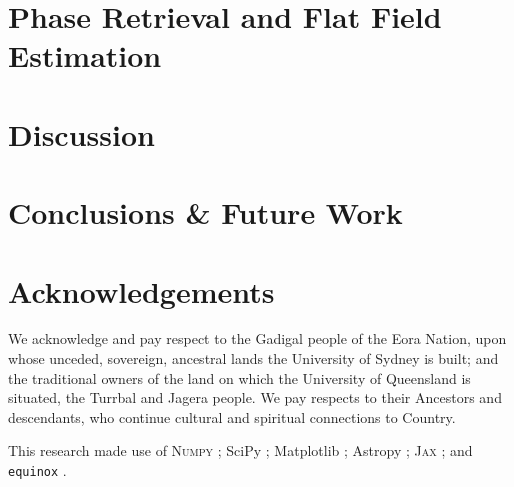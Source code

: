 \documentclass[twocolumn]{spie}
\begin{document}
\section{Phase Retrieval and Flat Field Estimation}
\label{sec:phaseretrieval}





\section{Discussion}

\section{Conclusions \& Future Work}




\section{Acknowledgements}

We acknowledge and pay respect to the Gadigal people of the Eora Nation, upon whose unceded, sovereign, ancestral lands the University of Sydney is built; and the traditional owners of the land on which the University of Queensland is situated, the Turrbal and Jagera people. We pay respects to their Ancestors and descendants, who continue cultural and spiritual connections to Country. 

This research made use of \textsc{Numpy} \cite{numpy}; SciPy \cite{scipy}; Matplotlib \cite{matplotlib}; Astropy \cite{astropy:2013,astropy:2018}; \textsc{Jax} \cite{jax}; and \texttt{equinox} \cite{kidger2021equinox}.


\end{document}
